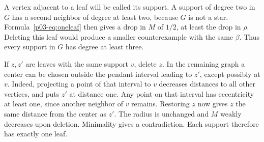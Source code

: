 \documentclass[11pt,a4paper]{article}
\begin{document}
A vertex adjacent to a leaf will be called its support. A support of
degree two in $G$ has a second neighbor of degree at least two, because
$G$ is not a star. Formula~\eqref{p03-eq:oneleaf} then gives a drop in
$M$ of $1/2$, at least the drop in $\rho$. Deleting this leaf would
produce a smaller counterexample with the same $\beta$. Thus every
support in $G$ has degree at least three.

If $z,z'$ are leaves with the same support $v$, delete $z$. In the
remaining graph a center can be chosen outside the pendant interval
leading to $z'$, except possibly at $v$. Indeed, projecting a point
of that interval to $v$ decreases distances to all other vertices,
and puts $z'$ at distance one. Any point on that interval has
eccentricity at least one, since another neighbor of $v$ remains.
Restoring $z$ now gives $z$ the same distance from the center as $z'$.
The radius is unchanged and $M$ weakly decreases upon deletion.
Minimality gives a contradiction. Each support therefore has exactly
one leaf.
\end{document}
